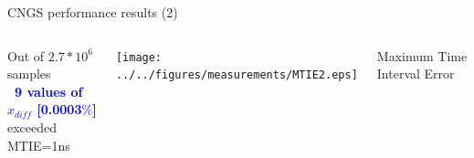 \documentclass[compress,red]{beamer}
\begin{document}
\begin{frame}{CNGS performance results (2)}

  \begin{columns}[c]
	\begin{center}

	    Out of $2.7*10^6$ samples\\
			\textbf{\textcolor{blue}{~9 values of $x_{diff}$ [0.0003$\%$]}} \\
                       exceeded MTIE=1ns
		
% 
	\end{center}
		\vspace{0.08cm}
		\begin{center}
		\texttt{[image: ../../figures/measurements/MTIE2.eps]}
		\end{center}
		\begin{center}
		Maximum Time Interval Error
		\end{center}
  \end{columns}
  \begin{columns}[c]

  \end{columns}
\end{frame}
\end{document}
